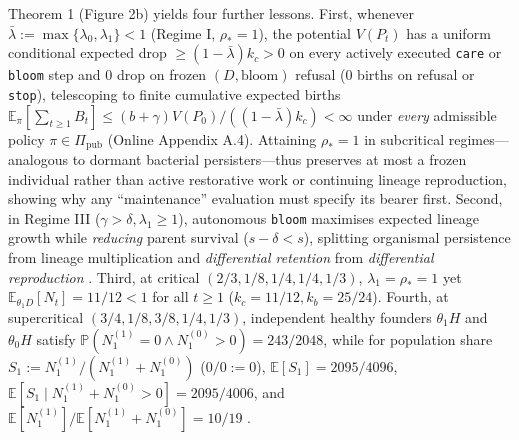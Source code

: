 \documentclass[12pt,letterpaper]{article}
\begin{document}
Theorem 1 (Figure 2b) yields four further lessons. First, whenever
\(\bar{\lambda} := \max\{\lambda_0, \lambda_1\} < 1\) (Regime I,
\(\rho_* = 1\)), the potential \(V(P_t)\) has a uniform conditional
expected drop \(\ge (1 - \bar{\lambda})k_c > 0\) on every actively
executed \texttt{care} or \texttt{bloom} step and \(0\) drop on frozen
\((D,\mathrm{bloom})\) refusal (\(0\) births on refusal or
\texttt{stop}), telescoping to finite cumulative expected births
\(\mathbb{E}_\pi[\sum_{t\ge 1} B_t] \le (b+\gamma)V(P_0)/((1-\bar{\lambda})k_c) < \infty\)
under \emph{every} admissible policy \(\pi \in \Pi_{\mathrm{pub}}\)
(Online Appendix A.4). Attaining \(\rho_* = 1\) in subcritical
regimes---analogous to dormant bacterial persisters---thus preserves at
most a frozen individual rather than active restorative work or
continuing lineage reproduction, showing why any ``maintenance''
evaluation must specify its bearer first. Second, in Regime III
(\(\gamma > \delta, \lambda_1 \ge 1\)), autonomous \texttt{bloom}
maximises expected lineage growth while \emph{reducing} parent survival
(\(s-\delta < s\)), splitting organismal persistence from lineage
multiplication \citep{okasha2006, godfreySmith2009} and
\emph{differential retention} from \emph{differential reproduction}
\citep{garson2019}. Third, at critical \((2/3, 1/8, 1/4, 1/4, 1/3)\),
\(\lambda_1 = \rho_* = 1\) yet
\(\mathbb{E}_{\theta_1 D}[N_t] = 11/12 < 1\) for all \(t \ge 1\)
(\(k_c=11/12, k_b=25/24\)). Fourth, at supercritical
\((3/4, 1/8, 3/8, 1/4, 1/3)\), independent healthy founders
\(\theta_1 H\) and \(\theta_0 H\) satisfy
\(\mathbb{P}(N_1^{(1)} = 0 \land N_1^{(0)} > 0) = 243/2048\), while for
population share \(S_1 := N_1^{(1)}/(N_1^{(1)} + N_1^{(0)})\)
(\(0/0 := 0\)), \(\mathbb{E}[S_1] = 2095/4096\),
\(\mathbb{E}[S_1 \mid N_1^{(1)} + N_1^{(0)} > 0] = 2095/4006\), and
\(\mathbb{E}[N_1^{(1)}]/\mathbb{E}[N_1^{(1)}+N_1^{(0)}] = 10/19\)
\citep{price1970, athreyaNey1972}.
\end{document}

